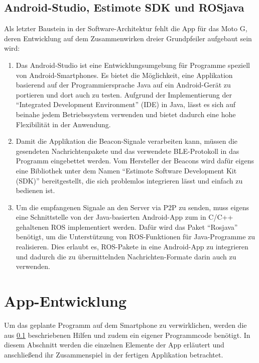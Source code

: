 \subsection{Android-Studio, Estimote SDK und ROSjava}\label{sec:Hilfen}
Als letzter Baustein in der Software-Architektur fehlt die App für das Moto G, deren Entwicklung auf dem Zusammenwirken dreier Grundpfeiler aufgebaut sein wird:
\begin{enumerate}
\item Das Android-Studio \cite{AndStu} ist eine Entwicklungsumgebung für Programme speziell von Android-Smartphones. Es bietet die Möglichkeit, eine Applikation basierend auf der Programmiersprache Java auf ein Android-Gerät zu portieren und dort auch zu testen. Aufgrund der Implementierung der "`Integrated Development Environment"' (IDE) in Java, lässt es sich auf beinahe jedem Betriebssystem verwenden und bietet dadurch eine hohe Flexibilität in der Anwendung.
\item Damit die Applikation die Beacon-Signale verarbeiten kann, müssen die gesendeten Nachrichtenpakete und das verwendete BLE-Protokoll in das Programm eingebettet werden. Vom Hersteller der Beacons wird dafür eigens eine Bibliothek unter dem Namen "`Estimote Software Development Kit (SDK)"' \cite{EstSDK} bereitgestellt, die sich problemlos integrieren lässt und einfach zu bedienen ist.
\item Um die empfangenen Signale an den Server via P2P zu senden, muss eigens eine Schnittstelle von der Java-basierten Android-App zum in C/C++ gehaltenen ROS implementiert werden. Dafür wird das Paket "`Rosjava"' \cite{ROSjava} benötigt, um die Unterstützung von ROS-Funktionen für Java-Programme zu realisieren. Dies erlaubt es, ROS-Pakete in eine Android-App zu integrieren und dadurch die zu übermittelnden Nachrichten-Formate darin auch zu verwenden.
\end{enumerate}
\section{App-Entwicklung}
Um das geplante Programm auf dem Smartphone zu verwirklichen, werden die aus \ref{sec:Hilfen} beschriebenen Hilfen und zudem ein eigener Programmcode benötigt. In diesem Abschnitt werden die einzelnen Elemente der App erläutert und anschließend ihr Zusammenspiel in der fertigen Applikation betrachtet. 
